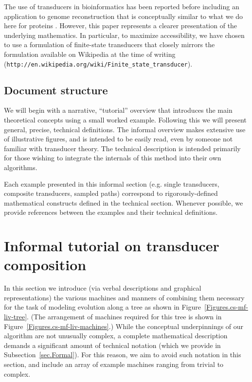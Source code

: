 \documentclass{article}
\newcommand{\secref}[1]{Subsection~\ref{sec.#1}}
\newcommand{\figref}[1]{Figure~\ref{Figures.#1}}
\begin{document}
The use of transducers in bioinformatics has been reported before \cite{Holmes2003,BradleyHolmes2007,SatijaEtAl2008,PatenEtAl2008}
including an application to genome reconstruction that is conceptually similar to what we do here for proteins \cite{PatenEtAl2008}.
However, this paper represents a clearer presentation of the underlying mathematics.
In particular, to maximize accessibility, we have chosen to use a formulation of finite-state transducers
that closely mirrors the formulation available on Wikipedia at the time of writing ({\tt http://en.wikipedia.org/wiki/Finite\_state\_transducer}).


\subsection{Document structure}  
We will begin with a narrative, ``tutorial'' overview that introduces the main
 theoretical concepts using a small worked example.
Following this we will present general, precise, technical definitions.
The informal overview makes extensive use of illustrative figures,
and is intended to be easily read, even by someone not familiar with transducer theory. 
The technical description is intended primarily for those wishing to integrate the 
internals of this method into their own algorithms.  

Each example presented in this informal section
 (e.g. single transducers, composite transducers, sampled paths) 
correspond to rigorously-defined mathematical constructs defined in the technical section. 
Whenever possible, we provide references between the examples and their technical definitions.

\section{Informal tutorial on transducer composition}

In this section we introduce (via verbal descriptions and graphical representations)
the various machines and manners of combining them necessary for the
task of modeling evolution along a tree as shown in  \figref{cs-mf-liv-tree}.  
(The arrangement of machines required for this tree is shown in \figref{cs-mf-liv-machines}.)
While the conceptual underpinnings of our algorithm are not unusually complex, 
a complete mathematical description demands a significant amount of technical notation (which we provide in \secref{Formal}). 
For this reason, we aim to avoid such notation in this section,
and include an array of example machines ranging from trivial to complex. 
\end{document}

